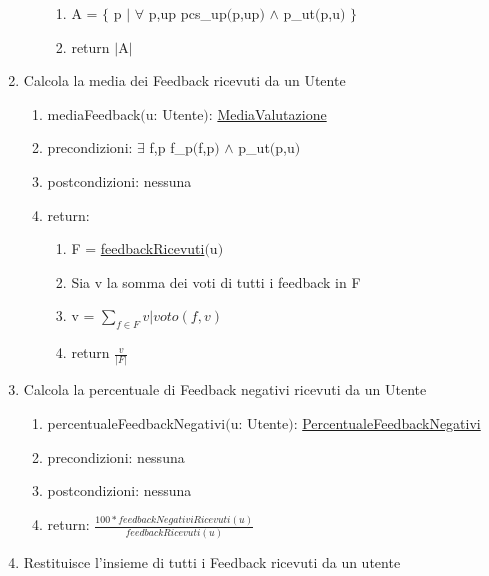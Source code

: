 \documentclass{article}
\begin{document}
\begin{enumerate}
\begin{enumerate}
        \begin{enumerate}
            \item A = $\{$ p $|$ $\forall$ p,up pcs\_up$($p,up$)$ $\land$ p\_ut$($p,u$)$ $\}$
            \item return $|$A$|$
        \end{enumerate}
    \end{enumerate}
    \newpage
    \item\label{sec:mediaFeedback} Calcola la media dei Feedback ricevuti da un Utente
    \begin{enumerate}
        \item mediaFeedback$($u: Utente$)$: \hyperref[sec:TipoMediaValutazione]{MediaValutazione}
        \item precondizioni: $\exists$ f,p f\_p$($f,p$)$ $\land$ p\_ut$($p,u$)$
        \item postcondizioni: nessuna
        \item return:
        \begin{enumerate}
            \item F = \hyperref[sec:feedbackRicevuti]{feedbackRicevuti}$($u$)$
            \item Sia v la somma dei voti di tutti i feedback in F
            \item v = $\sum_{f \in F} v | voto(f,v)$
            \item return $\frac{v}{|F|}$
        \end{enumerate}
    \end{enumerate}
    \newpage
    \item\label{sec:percentualeFeedbackNegativi} Calcola la percentuale di Feedback negativi ricevuti da un Utente
    \begin{enumerate}
        \item percentualeFeedbackNegativi$($u: Utente$)$: \hyperref[sec:TipoPercentualeFeedbackNegativi]{PercentualeFeedbackNegativi}
        \item precondizioni: nessuna
        \item postcondizioni: nessuna
        \item return: $\frac{100*\hyperref[sec:feedbackNegativiRicevuti]{feedbackNegativiRicevuti}(u)}{\hyperref[sec:feedbackRicevuti]{feedbackRicevuti}(u)}$
    \end{enumerate}
    \newpage
    \item\label{sec:feedbackRicevuti} Restituisce l'insieme di tutti i Feedback ricevuti da un utente
    \begin{enumerate}

\end{enumerate}
\end{enumerate}
\end{document}
